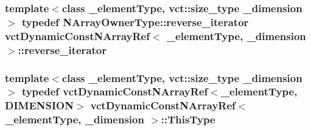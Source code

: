 \hypertarget{classvct_dynamic_const_n_array_ref_a5d4c22b61341f1d69f6bc0f7b176761b}{
\subsubsection[{reverse\-\_\-iterator}]{\setlength{\rightskip}{0pt plus 5cm}template$<$class \-\_\-element\-Type, vct\-::size\-\_\-type \-\_\-dimension$>$ typedef {\bf N\-Array\-Owner\-Type\-::reverse\-\_\-iterator} {\bf vct\-Dynamic\-Const\-N\-Array\-Ref}$<$ \-\_\-element\-Type, \-\_\-dimension $>$\-::{\bf reverse\-\_\-iterator}}}\label{classvct_dynamic_const_n_array_ref_a5d4c22b61341f1d69f6bc0f7b176761b}
\hypertarget{classvct_dynamic_const_n_array_ref_aa156bc5f7cf482d155b45f75c59a3c72}{
\subsubsection[{This\-Type}]{\setlength{\rightskip}{0pt plus 5cm}template$<$class \-\_\-element\-Type, vct\-::size\-\_\-type \-\_\-dimension$>$ typedef {\bf vct\-Dynamic\-Const\-N\-Array\-Ref}$<$\-\_\-element\-Type, {\bf D\-I\-M\-E\-N\-S\-I\-O\-N}$>$ {\bf vct\-Dynamic\-Const\-N\-Array\-Ref}$<$ \-\_\-element\-Type, \-\_\-dimension $>$\-::{\bf This\-Type}}}\label{classvct_dynamic_const_n_array_ref_aa156bc5f7cf482d155b45f75c59a3c72}


